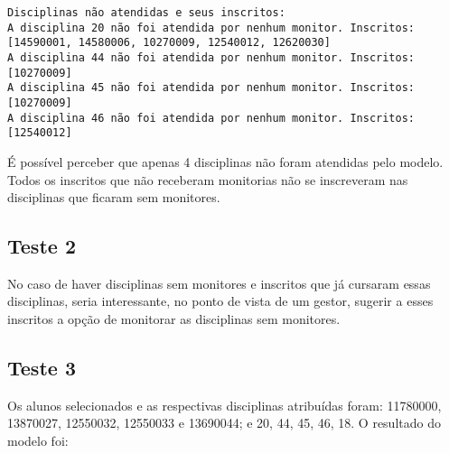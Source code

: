 \documentclass[a4paper,12pt]{article}
\begin{document}
\begin{lstlisting}[breaklines=true]
Disciplinas não atendidas e seus inscritos:
A disciplina 20 não foi atendida por nenhum monitor. Inscritos: [14590001, 14580006, 10270009, 12540012, 12620030]
A disciplina 44 não foi atendida por nenhum monitor. Inscritos: [10270009]
A disciplina 45 não foi atendida por nenhum monitor. Inscritos: [10270009]
A disciplina 46 não foi atendida por nenhum monitor. Inscritos: [12540012]
\end{lstlisting}

É possível perceber que apenas 4 disciplinas não foram atendidas pelo modelo. Todos os inscritos que não receberam monitorias não se inscreveram nas disciplinas que ficaram sem monitores.

\subsection{Teste 2}

No caso de haver disciplinas sem monitores e inscritos que já cursaram essas disciplinas, seria interessante, no ponto de vista de um gestor, sugerir a esses inscritos a opção de monitorar as disciplinas sem monitores.

\subsection{Teste 3}

Os alunos selecionados e as respectivas disciplinas atribuídas foram: 11780000, 13870027, 12550032, 12550033 e 13690044; e 20, 44, 45, 46, 18. O resultado do modelo foi:
\end{document}
